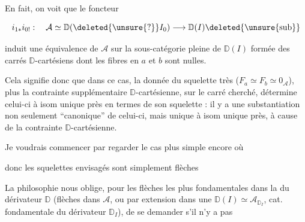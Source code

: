 En fait, on voit  que le foncteur

\[
i_{1*}i_{0!}:\quad\mathcal A\simeq\mathbb D(\deleted{\unsure{?}}I_0)\longrightarrow\mathbb D(I)\deleted{\unsure{\mathrm{sub}}}
\]

induit une équivalence de $\mathcal A$ sur la sous-catégorie pleine de $\mathbb D(I)$ formée des carrés $\mathbb D$-cartésiens  dont les fibres en $a$ et $b$ sont nulles. 

Cela signifie donc que dans ce cas, la donnée du squelette  très  ($F_a\simeq F_b\simeq0_{\mathcal A}$), plus la contrainte supplémentaire $\mathbb D$-cartésienne, sur le carré cherché, détermine celui-ci à isom unique près en termes de son squelette : il y a une substantiation non seulement ``canonique'' de celui-ci, mais  unique à isom unique près,  à cause de la contrainte $\mathbb D$-cartésienne.

Je voudrais commencer par regarder le cas plus simple encore où


donc  les squelettes envisagés sont simplement  flèches


La philosophie nous oblige, pour les flèches les plus fondamentales dans la  du dérivateur $\mathbb D$ (flèches dans $\mathcal A$, ou par extension dans une $\mathbb D(I)\simeq\mathcal A_{\mathbb D_I}$, cat. fondamentale du  dérivateur  $\mathbb D_I$), de se demander s'il n'y a pas
